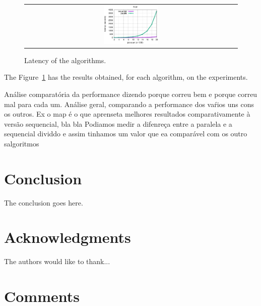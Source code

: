 \documentclass[conference,compsoc]{IEEEtran}
\begin{document}
\begin{figure}[h!]
\begin{tabular}{cc}
    \multicolumn{2}{c}{\includegraphics[width=0.265\textwidth]{plots/Scan.eps}}\\

  \end{tabular}
\caption{Latency of the algorithms.} \label{latency}
\end{figure}

The Figure~\ref{latency} has the results obtained, for each algorithm, on the experiments.

Análise comparatória da performance dizendo porque correu bem e porque correu mal para cada um.
Análise geral, comparando a performance dos vaŕios uns cons os outros. Ex o map é o que aprenseta melhores resultados comparativamente à versão sequencial, bla bla
Podiamos medir a difenreça entre a paralela e a sequencial dividdo e assim tinhamos um valor que ea comparável com os outro salgoritmos

\section{Conclusion} \label{Conclusion}
The conclusion goes here.

\section*{Acknowledgments}

The authors would like to thank...



\section*{Comments}
\end{document}
